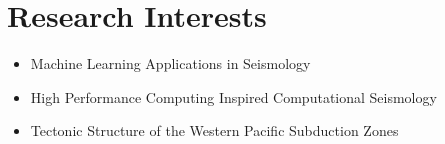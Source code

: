 \section{Research Interests}

\begin{itemize}
\item Machine Learning Applications in Seismology
\item High Performance Computing Inspired Computational Seismology
\item Tectonic Structure of the Western Pacific Subduction Zones
\end{itemize}
